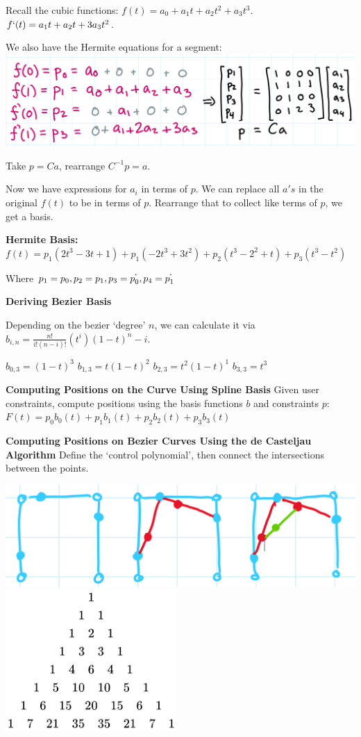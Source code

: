 \documentclass[letterpaper, 8pt]{extarticle}
\begin{document}
\begin{multicols*}{4}
    Recall the cubic functions:
    $f(t) = a_0 + a_1t + a_2t^2 + a_3t^3$.
    $f`(t) = a_1t + a_2t + 3a_3t^2$.

    We also have the Hermite equations for a segment:
    \includegraphics[width=0.8\linewidth]{
        curve-basis-soe.png}

    Take $p=Ca$, rearrange $C^{-1}p=a$.

    Now we have expressions for $a_i$ in terms of $p$. We can replace all $a's$ in the original $f(t)$ to be in terms of $p$. Rearrange that to collect like terms of $p$, we get a basis.


    \textbf{Hermite Basis:}
    $f(t) = p_1(2t^3 - 3t + 1) + p_1(-2t^3+3t^2) + p_2(t^3-2^2 + t) + p_3(t^3-t^2)$

    Where $p_1 = p_0, p_2 = p_1, p_3 = p^`_0, p_4 = p^`_1$

    \textbf{Deriving Bezier Basis}

    Depending on the bezier `degree' $n$, we can calculate it via $b_{i,n} = \frac{n!}{i!(n-i)!}(t^i)(1-t)^n-i$.

    $b_{0,3} = (1-t)^3$
    $b_{1,3} = t(1-t)^2$
    $b_{2,3} = t^2(1-t)^1$
    $b_{3,3} = t^3$


    \textbf{Computing Positions on the Curve Using Spline Basis}
    Given user constraints, compute positions using the basis functions $b$ and constraints $p$: $F(t) = p_0b_0(t) + p_1b_1(t) + p_2b_2(t) + p_3b_3(t)$
    
    \textbf{Computing Positions on Bezier Curves Using the de Casteljau Algorithm}
    Define the `control polynomial', then connect the intersections between the points.
    
    \includegraphics[width=0.5\linewidth]{bezier.png}
    \includegraphics[width=0.3\linewidth]{pascal.png}

\end{multicols*}
\end{document}
